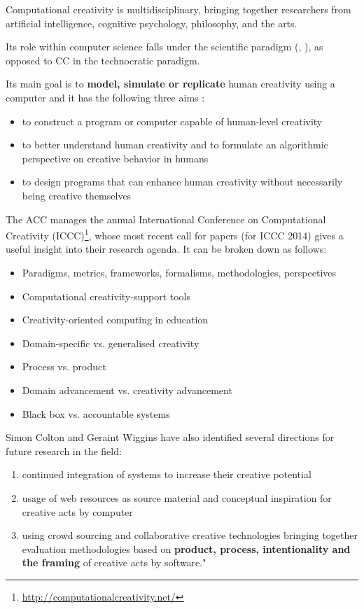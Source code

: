 Computational creativity is multidisciplinary, bringing together researchers from artificial intelligence, cognitive psychology, philosophy, and the arts.

\begin{draft}
  Its role within computer science falls under the scientific paradigm (\citep[p.8]{Hugill2013c}, \citep[see also]{Eden2007}), as opposed to CC in the technocratic paradigm.
\end{draft}

Its main goal is to \textbf{model, simulate or replicate} human creativity using a computer and it has the following three aims :

\begin{itemize}
  \item to construct a program or computer capable of human-level creativity
  \item to better understand human creativity and to formulate an algorithmic perspective on creative behavior in humans
  \item to design programs that can enhance human creativity without necessarily being creative themselves
\end{itemize}

The ACC manages the annual International Conference on Computational Creativity (ICCC)\footnote{\url{http://computationalcreativity.net/}}, whose most recent call for papers  (for ICCC 2014) gives a useful insight into their research agenda. It can be broken down as follows:

\begin{itemize}
  \item Paradigms, metrics, frameworks, formalisms, methodologies, perspectives
  \item Computational creativity-support tools
  \item Creativity-oriented computing in education
  \item Domain-specific vs. generalised creativity
  \item Process vs. product
  \item Domain advancement vs. creativity advancement
  \item Black box vs. accountable systems
\end{itemize}

Simon Colton and Geraint Wiggins have also identified several directions for future research in the field: \citep[p.5]{Colton2012}

\begin{enumerate}
  \item continued integration of systems to increase their creative potential
  \item usage of web resources as source material and conceptual inspiration for creative acts by computer
  \item using crowd sourcing and collaborative creative technologies
  bringing together evaluation methodologies based on \textbf{product, process, intentionality and the framing} of creative acts by software." \citep[p.5]{Colton2012}
\end{enumerate}

